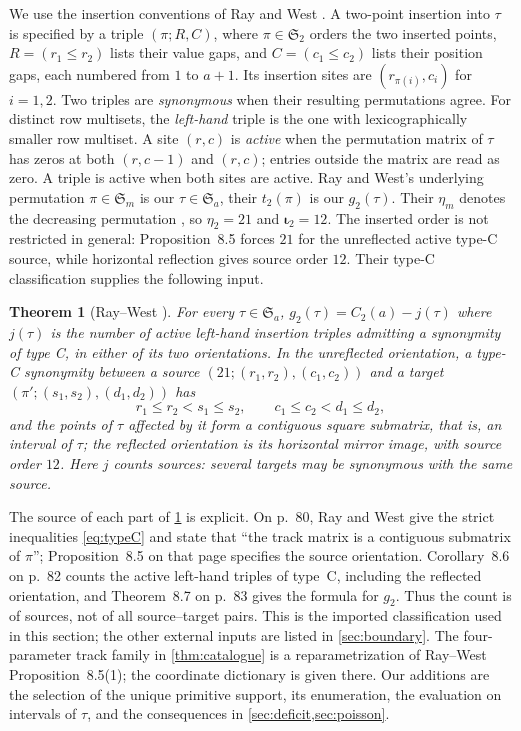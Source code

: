 \documentclass[11pt,reqno]{amsart}
\theoremstyle{plain}
\newtheorem{theorem}{Theorem}[section]
\theoremstyle{definition}
\theoremstyle{remark}
\let\greekiota\iota
\renewcommand{\iota}{\boldsymbol{\greekiota}}
\newcommand{\Sym}{\mathfrak{S}}
\begin{document}
We use the insertion conventions of Ray and West
\cite[\S4, p.~64; \S5, p.~67]{RayWest2003}. A two-point insertion into
$\tau$ is specified by a triple $(\pi;R,C)$, where $\pi\in\Sym_2$ orders
the two inserted points, $R=(r_1\le r_2)$ lists their value gaps, and
$C=(c_1\le c_2)$ lists their position gaps, each numbered from $1$ to
$a+1$. Its insertion sites are $(r_{\pi(i)},c_i)$ for $i=1,2$.
Two triples are \emph{synonymous} when their resulting permutations agree.
For distinct row multisets, the \emph{left-hand} triple is the one with
lexicographically smaller row multiset. A site $(r,c)$ is \emph{active}
when the permutation matrix of $\tau$ has zeros at both $(r,c-1)$ and
$(r,c)$; entries outside the matrix are read as zero. A triple is active
when both sites are active. Ray and West's underlying permutation
$\pi\in\Sym_m$ is our $\tau\in\Sym_a$, their $t_2(\pi)$ is our
$g_2(\tau)$. Their $\eta_m$ denotes the decreasing permutation
\cite[p.~58]{RayWest2003}, so $\eta_2=21$ and $\iota_2=12$.
The inserted order is not restricted in general: Proposition~8.5 forces
$21$ for the unreflected active type-C source, while horizontal
reflection gives source order $12$.
Their type-C classification supplies the following input.

\begin{theorem}[Ray--West {\cite[pp.~80--83]{RayWest2003}}]\label{thm:RW}
For every $\tau\in\Sym_a$, $g_2(\tau)=C_2(a)-j(\tau)$ where $j(\tau)$ is the number of active left-hand insertion triples admitting a synonymity of type C, in either of its two orientations. In the unreflected orientation, a type-C synonymity between a source $(21;(r_1,r_2),(c_1,c_2))$ and a target $(\pi';(s_1,s_2),(d_1,d_2))$ has
\begin{equation}\label{eq:typeC}
r_1\le r_2<s_1\le s_2,\qquad c_1\le c_2<d_1\le d_2,
\end{equation}
and the points of $\tau$ affected by it form a contiguous square submatrix, that is, an interval of $\tau$; the reflected orientation is its horizontal mirror image, with source order $12$. Here $j$ counts sources: several targets may be synonymous with the same source.
\end{theorem}

The source of each part of \cref{thm:RW} is explicit. On p.~80,
Ray and West give the strict inequalities \eqref{eq:typeC} and state that
``the track matrix is a contiguous submatrix of $\pi$'';
Proposition~8.5 on that page specifies the source orientation.
Corollary~8.6 on p.~82 counts the active left-hand triples of type~C,
including the reflected orientation, and Theorem~8.7 on p.~83 gives the
formula for $g_2$. Thus the count is of sources, not of all source--target
pairs. This is the imported classification used in this section; the
other external inputs are listed in \cref{sec:boundary}.
The four-parameter track family in \cref{thm:catalogue} is a
reparametrization of Ray--West Proposition~8.5(1); the coordinate
dictionary is given there. Our additions are the selection of the unique
primitive support, its enumeration, the evaluation on intervals of
$\tau$, and the consequences in \cref{sec:deficit,sec:poisson}.
\end{document}
